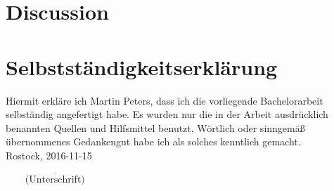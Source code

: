 \documentclass[12pt, a4paper, titlepage]{book}
\begin{document}
	\chapter{Discussion}
	
	
	\nocite{Scharm2014a} %
	
	
	
	
	\begin{appendices}
		\appendixpage
		\noappendicestocpagenum
		\addappheadtotoc
		
		
	\end{appendices}
	
	\chapter*{Selbstständigkeitserklärung}
	Hiermit erkläre ich Martin Peters, dass ich die vorliegende Bachelorarbeit selbständig angefertigt habe. Es wurden nur die in der Arbeit ausdrücklich benannten Quellen und Hilfsmittel benutzt. Wörtlich oder sinngemäß übernommenes Gedankengut habe ich als solches kenntlich gemacht.
	\\[64pt]
	\noindent Rostock, 2016-11-15
	\begin{flushright}
		$\overline{~~~~~~~~~\mbox{(Unterschrift)}~~~~~~~~~}$
	\end{flushright}
\end{document}
